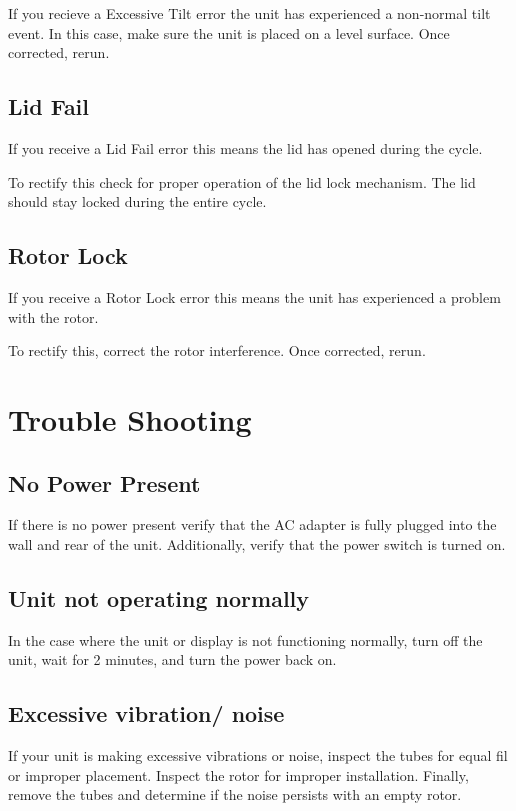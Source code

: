 \documentclass[12pt]{../SOP3_beta}
\begin{document}
\NP If you recieve a Excessive Tilt error the unit has experienced a non-normal tilt event. In this case, make sure the unit is placed on a level surface. Once corrected, rerun. 

\subsection*{Lid Fail}

\NP If you receive a Lid Fail error this means the lid has opened during the cycle. 

\NP To rectify this check for proper operation of the lid lock mechanism. The lid should stay locked during the entire cycle. 

\subsection*{Rotor Lock}

\NP If you receive a Rotor Lock error this means the unit has experienced a problem with the rotor. 

\NP To rectify this, correct the rotor interference. Once corrected, rerun. 

\section{Trouble Shooting}

\subsection*{No Power Present} 

\NP If there is no power present verify that the AC adapter is fully plugged into the wall and rear of the unit. Additionally, verify that the power switch is turned on. 

\subsection*{Unit not operating normally}

\NP In the case where the unit or display is not functioning normally, turn off the unit, wait for 2 minutes, and turn the power back on. 

\subsection*{Excessive vibration/ noise}

\NP If your unit is making excessive vibrations or noise, inspect the tubes for equal fil or improper placement. Inspect the rotor for improper installation. Finally, remove the tubes and determine if the noise persists with an empty rotor. 
\end{document}
